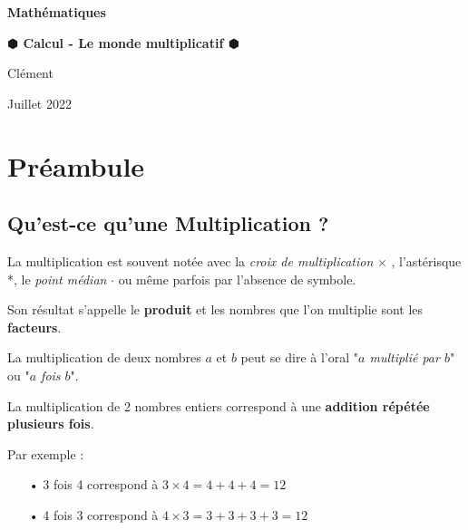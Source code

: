 \documentclass[a4paper]{article}
\begin{document}
	\begin{titlepage}
		\begin{center}
		
\Huge  		\textbf{Mathématiques}\\
		\bigskip \smallskip
		
\Large		\textbf{$\varhexagonblack$ Calcul - Le monde multiplicatif $\varhexagonblack$}\\
		\bigskip
		
\large		Clément   \\ 
		\smallskip
		
\normalfont	Juillet 2022\\
		
		\end{center}
		
\doublespacing
\tableofcontents
\singlespacing

	\end{titlepage}







\section{Préambule}

\subsection*{Qu'est-ce qu'une Multiplication ?}

	La multiplication est souvent notée avec la \textit{croix de multiplication} $\times$ , l'astérisque *, le \textit{point médian} $\cdot$ ou même parfois par l'absence de symbole.
	
	Son résultat s'appelle le \textbf{produit} et les nombres que l'on multiplie sont les \textbf{facteurs}.

	La multiplication de deux nombres $a$ et $b$ peut se dire à l'oral "\textit{$a$ multiplié par $b$}" ou "\textit{$a$ fois $b$}".\\
	
\vspace{-2 mm}

	La multiplication de 2 nombres entiers correspond à une \textbf{addition répétée plusieurs fois}.

{\noindent Par exemple :}

	\begin{itemize}
	\onehalfspacing
	\item[•] 3 fois 4 correspond à $3 \times 4 = 4 + 4 + 4 = 12$
	\item[•] 4 fois 3 correspond à $4 \times 3 = 3 + 3 + 3 + 3 = 12$
	
	\end{itemize}
\singlespacing
\vspace{-2 mm}
\end{document}
